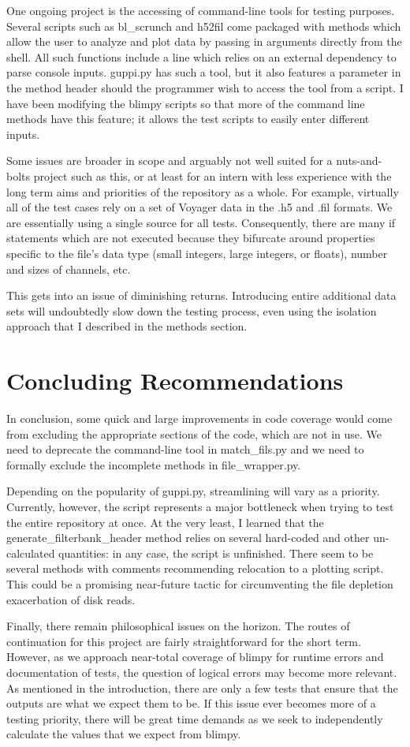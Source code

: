 \documentclass[12pt]{article}
\begin{document}
One ongoing project is the accessing of command-line tools for testing purposes. Several scripts such as bl\_scrunch and h52fil come packaged with methods which allow the user to analyze and plot data by passing in arguments directly from the shell. All such functions include a line which relies on an external dependency to parse console inputs. guppi.py has such a tool, but it also features a parameter in the method header should the programmer wish to access the tool from a script. I have been modifying the blimpy scripts so that more of the command line methods have this feature; it allows the test scripts to easily enter different inputs.

Some issues are broader in scope and arguably not well suited for a nuts-and-bolts project such as this, or at least for an intern with less experience with the long term aims and priorities of the repository as a whole. For example, virtually all of the test cases rely on a set of Voyager data in the .h5 and .fil formats. We are essentially using a single source for all tests. Consequently, there are many if statements which are not executed because they bifurcate around properties specific to the file's data type (small integers, large integers, or floats), number and sizes of channels, etc.

This gets into an issue of diminishing returns. Introducing entire additional data sets will undoubtedly slow down the testing process, even using the isolation approach that I described in the methods section.

\section{Concluding Recommendations}

\quad \quad In conclusion, some quick and large improvements in code coverage would come from excluding the appropriate sections of the code, which are not in use. We need to deprecate the command-line tool in match\_fils.py and we need to formally exclude the incomplete methods in file\_wrapper.py.

Depending on the popularity of guppi.py, streamlining will vary as a priority. Currently, however, the script represents a major bottleneck when trying to test the entire repository at once. At the very least, I learned that the generate\_filterbank\_header method relies on several hard-coded and other un-calculated quantities: in any case, the script is unfinished. There seem to be several methods with comments recommending relocation to a plotting script. This could be a promising near-future tactic for circumventing the file depletion exacerbation of disk reads.

Finally, there remain philosophical issues on the horizon. The routes of continuation for this project are fairly straightforward for the short term. However, as we approach near-total coverage of blimpy for runtime errors and documentation of tests, the question of logical errors may become more relevant. As mentioned in the introduction, there are only a few tests that ensure that the outputs are what we expect them to be. If this issue ever becomes more of a testing priority, there will be great time demands as we seek to independently calculate the values that we expect from blimpy.
\end{document}

